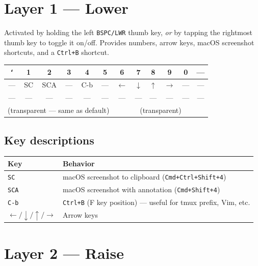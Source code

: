 \documentclass[11pt, letterpaper]{article}
\begin{document}
\section{Layer 1 — Lower}

Activated by holding the left \texttt{BSPC/LWR} thumb key, \emph{or} by
tapping the rightmost thumb key to toggle it on/off. Provides numbers,
arrow keys, macOS screenshot shortcuts, and a \texttt{Ctrl+B} shortcut.

\begin{center}
\renewcommand{\arraystretch}{1.4}
\begin{tabular}{|c|c|c|c|c|c||c|c|c|c|c|c|}
\hline
\texttt{`} & 1 & 2 & 3 & 4 & 5 & 6 & 7 & 8 & 9 & 0 & --- \\
\hline
--- & SC & SCA & --- & C-b & --- & $\leftarrow$ & $\downarrow$ & $\uparrow$ & $\rightarrow$ & --- & --- \\
\hline
--- & --- & --- & --- & --- & --- & --- & --- & --- & --- & --- & --- \\
\hline
\multicolumn{6}{|c|}{(transparent — same as default)} &
\multicolumn{6}{c|}{(transparent)} \\
\hline
\end{tabular}
\end{center}

\subsection*{Key descriptions}

\begin{tabular}{lp{9cm}}
\toprule
\textbf{Key} & \textbf{Behavior} \\
\midrule
\texttt{SC}              & macOS screenshot to clipboard (\texttt{Cmd+Ctrl+Shift+4}) \\
\texttt{SCA}             & macOS screenshot with annotation (\texttt{Cmd+Shift+4}) \\
\texttt{C-b}             & \texttt{Ctrl+B} (F key position) — useful for tmux prefix, Vim, etc. \\
$\leftarrow / \downarrow / \uparrow / \rightarrow$ & Arrow keys \\
\bottomrule
\end{tabular}

\section{Layer 2 — Raise}
\end{document}
